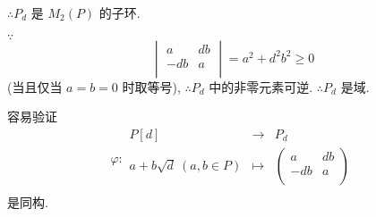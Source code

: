 \documentclass[color=black,device=normal,lang=cn,mode=geye]{elegantnote}
\begin{document}
$\therefore P_d$ 是 $M_2(P)$ 的子环.

$\because$
\[\begin{vmatrix}
    a & db \\
    -db & a \\
\end{vmatrix}=a^2+d^2b^2\geq0\]
(当且仅当 $a=b=0$ 时取等号), $\therefore P_d$ 中的非零元素可逆. $\therefore P_d$ 是域.

容易验证%
\[\varphi:\begin{array}{rcl}
    P[d] & \to & P_d \\
    a+b\sqrt{d}\ (a,b\in P) & \mapsto & \begin{pmatrix}
        a & db \\
        -db & a \\
    \end{pmatrix} \\
\end{array}\]
是同构.
\end{document}
